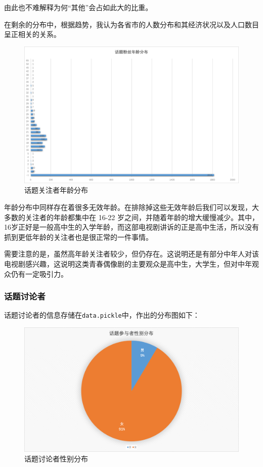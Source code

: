 \documentclass[a4paper,UTF8]{ctexart}
\begin{document}
由此也不难解释为何``其他''会占如此大的比重。

在剩余的分布中，根据趋势，我认为各省市的人数分布和其经济状况以及人口数目呈正相关的关系。

\begin{figure}[htbp]
\centering
\includegraphics{img/followers_age.png}
\caption{话题关注者年龄分布}
\end{figure}

年龄分布中同样存在着很多无效年龄。在排除掉这些无效年龄后我们可以发现，大多数的关注者的年龄都集中在
16-22
岁之间，并随着年龄的增大缓慢减少。其中，16岁正好是一般高中生的入学年龄，而这部电视剧讲诉的正是高中生活，所以没有抓到更低年龄的关注者也是很正常的一件事情。

需要注意的是，虽然高年龄关注者较少，但仍存在。这说明还是有部分中年人对该电视剧感兴趣，这说明这类青春偶像剧的主要观众是高中生，大学生，但对中年观众仍有一定吸引力。

\subsubsection{话题讨论者}\label{ux8bddux9898ux8ba8ux8bbaux8005}

话题讨论者的信息存储在\texttt{data.pickle}中，作出的分布图如下：

\begin{figure}[htbp]
\centering
\includegraphics{img/participants_gender.png}
\caption{话题讨论者性别分布}
\end{figure}
\end{document}

